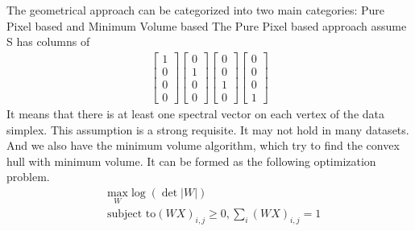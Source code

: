 \documentclass[14pt]{book}
\begin{document}
The geometrical approach can be categorized into two main categories: Pure Pixel based and Minimum Volume based 
The Pure Pixel based approach assume  S has columns of
\begin{equation}
\begin{aligned}
\begin{bmatrix}
1\\ 
0\\ 
0\\ 
0
\end{bmatrix}
\begin{bmatrix}
0\\ 
1\\ 
0\\ 
0
\end{bmatrix}
\begin{bmatrix}
0\\ 
0\\ 
1\\ 
0
\end{bmatrix}
\begin{bmatrix}
0\\ 
0\\ 
0\\ 
1

\end{bmatrix}
\end{aligned}
\end{equation}
It means that there is at least one spectral vector on each vertex of the data simplex. This assumption is a strong requisite. It may not hold in many datasets. 
And we also have the minimum volume algorithm, which try to find the convex hull with minimum volume. 
It can be formed as the following optimization problem. 
\begin{equation}
\begin{aligned}
& \underset{W}{\text{max}}\log(\det|W|)  \\
& \text{subject to}  (WX)_{i,j}\geq 0,\sum_i (WX)_{i,j} = 1\\
\end{aligned}
\end{equation}
\end{document}
